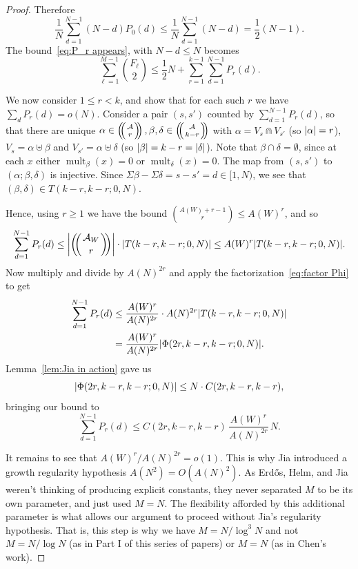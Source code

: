 \documentclass[10pt,a4paper]{amsart}
\DeclareMathOperator{\mult}{mult}
\DeclarePairedDelimiter{\abs}{\lvert}{\rvert}
\newcommand{\cA}{\mathcal{A}}
\newcommand{\multibinom}[2]{\left(\kern-0.3em\left(\genfrac{}{}{0pt}{}{#1}{#2}\right)\kern-0.3em\right)}
\begin{document}
\begin{proof}
Therefore
\begin{equation}\label{eq:disjoint}
   \frac1N \sum_{d=1}^{N-1}(N-d) P_0(d) \le \frac 1N \sum_{d=1}^{N-1}(N-d) = \frac12 (N-1).
\end{equation}
The bound~\eqref{eq:P_r appears}, with $N-d \le N$ becomes
  \begin{equation}\label{eq:P_0 is gone}
    \sum_{\ell=1}^{M-1}\binom{F_\ell}{2}
    \le \frac12 N + \sum_{r=1}^{k-1} \sum_{d=1}^{N-1} P_r(d).
  \end{equation}

We now consider $1 \le r < k$, and show that for each such $r$ we have $\sum_d P_r(d)=o(N)$.  
Consider a pair $(s,s')$ counted by $\sum_{d=1}^{N-1} P_r(d)$, so that there are unique $\alpha\in \multibinom{\cA}{r}, \beta,\delta \in \multibinom{\cA}{k-r}$ with $\alpha =V_s \Cap V_{s'}$ (so $\abs{\alpha}=r$), $V_s = \alpha \uplus \beta$ and $V_{s'} = \alpha \uplus \delta$ (so $\abs{\beta}=k-r = \abs{\delta}$). 
Note that $\beta \cap \delta = \emptyset$, since at each $x$ either $\mult_\beta(x)=0$ or $\mult_\delta(x)=0$.
The map from $(s,s')$ to $(\alpha;\beta,\delta)$ is injective. 
Since $\Sigma \beta -\Sigma\delta =s-s' =d \in [1,N)$, we see that $(\beta,\delta) \in T(k-r,k-r;0,N)$.

Hence, using $r\ge 1$ we have the bound $\binom{A(W)+r-1}{r}\le A(W)^{r}$, and so
\[
   \sum_{d=1}^{N-1}P_r(d)
   \le \abs*{\multibinom{\cA_W}{r}}\cdot\abs*{T(k-r,k-r;0,N)}
   \le A(W)^{r} \abs*{T(k-r,k-r;0,N)}.
\]
Now multiply and divide by $A(N)^{2r}$ and apply the factorization~\eqref{eq:factor Phi} to get
\begin{align*}
   \sum_{d=1}^{N-1}P_r(d)
   &\le\frac{A(W)^{r}}{A(N)^{2r}}\cdot A(N)^{2r} \abs*{T(k-r,k-r;0,N)}\\
   &=\frac{A(W)^{r}}{A(N)^{2r}} \abs*{\Phi(2r,k-r,k-r;0,N)}.
\end{align*}
Lemma~\ref{lem:Jia in action} gave us
\[
   \abs*{\Phi(2r,k-r,k-r;0,N)}\le N \cdot C(2r,k-r,k-r),
\]
bringing our bound to
  \[\sum_{d=1}^{N-1} P_r(d) \le  C(2r,k-r,k-r) \, \frac{A(W)^{r}}{A(N)^{2r}}\,  N.\]


It remains to see that $A(W)^r/A(N)^{2r}=o(1)$. This is why Jia introduced a growth regularity hypothesis $A(N^2) = O(A(N)^2)$. As Erd\H{o}s, Helm, and Jia weren't thinking of producing explicit constants, they never separated $M$ to be its own parameter, and just used $M=N$. The flexibility afforded by this additional parameter is what allows our argument to proceed without Jia's regularity hypothesis. That is, this step is why we have $M=N/\log^3 N$ and not $M=N/\log N$ (as in Part I of this series of papers) or $M=N$ (as in Chen's work).


\end{proof}
\end{document}

